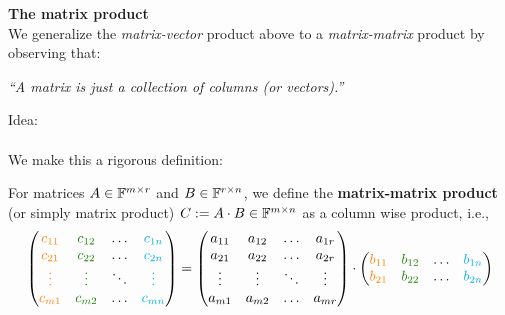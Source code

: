 \begin{frame} 
\textbf{The matrix product}\\
We generalize the \textit{matrix-vector} product above to a \textit{matrix-matrix} product by observing that: 
\begin{center}
	\textit{``A matrix is just a collection of columns (or vectors).''}
\end{center}
Idea:\\
~\\
We make this a rigorous definition:\vspace{-0.25cm}
\begin{defi} \label{def:mat-mat-product}
	For matrices $A\in\F^{m\times r}$ and $B\in\F^{r\times n}$, we define the {\color{defgruen}\textbf{matrix-matrix product} (or simply matrix product) $C := A\cdot B \in\F^{m\times n}$} as a column wise product, i.e.,
	$$
	\begin{pmatrix}
	{\color{orange}c_{11}}&{\color[rgb]{0.1,0.5,0}c_{12}}&\ldots &{\color{cyan}c_{1n}}\\
	{\color{orange}c_{21}}&{\color[rgb]{0.1,0.5,0}c_{22}}&\ldots &{\color{cyan}c_{2n}}\\
	{\color{orange}\vdots}&{\color[rgb]{0.1,0.5,0}\vdots}&\ddots &{\color{cyan}\vdots}\\
	{\color{orange}c_{m1}}&{\color[rgb]{0.1,0.5,0}c_{m2}}&\ldots &{\color{cyan}c_{mn}}
	\end{pmatrix}
	=\begin{pmatrix}
	a_{11}&a_{12}&\ldots &a_{1r}\\
	a_{21}&a_{22}&\ldots &a_{2r}\\
	\vdots&\vdots&\ddots &\vdots\\
	a_{m1}&a_{m2}&\ldots &a_{mr}
	\end{pmatrix}
	\cdot
	\begin{pmatrix}
	{\color{orange}b_{11}}&{\color[rgb]{0.1,0.5,0}b_{12}}&\ldots &{\color{cyan}b_{1n}}\\
	{\color{orange}b_{21}}&{\color[rgb]{0.1,0.5,0}b_{22}}&\ldots &{\color{cyan}b_{2n}}\\

\end{pmatrix}$$
\end{defi}
\end{frame}
